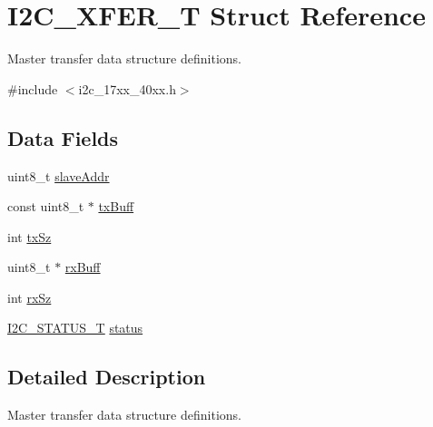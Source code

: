 \hypertarget{structI2C__XFER__T}{\section{I2\-C\-\_\-\-X\-F\-E\-R\-\_\-\-T Struct Reference}
\label{structI2C__XFER__T}
}


Master transfer data structure definitions.  




{\ttfamily \#include $<$i2c\-\_\-17xx\-\_\-40xx.\-h$>$}

\subsection*{Data Fields}
\begin{DoxyCompactItemize}
\item 
uint8\-\_\-t \hyperlink{structI2C__XFER__T_a39393422071ba7bca5d22e15b110e723}{slave\-Addr}
\item 
const uint8\-\_\-t $\ast$ \hyperlink{structI2C__XFER__T_a673ce41b59a715c6e91e3d041885554b}{tx\-Buff}
\item 
int \hyperlink{structI2C__XFER__T_a6ff8668411b06d3dc4ab9d942ffca896}{tx\-Sz}
\item 
uint8\-\_\-t $\ast$ \hyperlink{structI2C__XFER__T_a905dce25e8fc1dc85c4b76e789f62623}{rx\-Buff}
\item 
int \hyperlink{structI2C__XFER__T_a8c5b062847cfd0fe9b27058743de8aa5}{rx\-Sz}
\item 
\hyperlink{group__I2C__17XX__40XX_ga21aa839302786105dcf6a96be0e6e8bc}{I2\-C\-\_\-\-S\-T\-A\-T\-U\-S\-\_\-\-T} \hyperlink{structI2C__XFER__T_aefc3cfe9bf7cdaeb2a632c42250602ad}{status}
\end{DoxyCompactItemize}


\subsection{Detailed Description}
Master transfer data structure definitions. 

